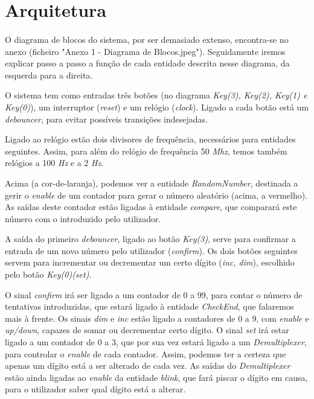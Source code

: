 \documentclass[11pt,openany,twoside]{report}
\begin{document}
\section{Arquitetura}

\paragraph{ } O diagrama de blocos do sistema, por ser demasiado extenso, encontra-se no anexo (ficheiro "Anexo 1 - Diagrama de Blocos.jpeg"). Seguidamente iremos explicar passo a passo a função de cada entidade descrita nesse diagrama, da esquerda para a direita.

O sistema tem como entradas três botões (no diagrama \textit{Key(3), Key(2), Key(1) e Key(0)}), um interruptor (\textit{reset}) e um relógio (\textit{clock}). Ligado a cada botão está um \textit{debouncer}, para evitar possíveis transições indesejadas. 

Ligado ao relógio estão dois divisores de frequência, necessários para entidades seguintes. Assim, para além do relógio de frequência 50 \textit{Mhz}, temos também relógios a 100 \textit{Hz} e a 2 \textit{Hz}.

Acima (a cor-de-laranja), podemos ver a entidade \textit{RandomNumber}, destinada a gerir o \textit{enable} de um contador para gerar o número aleatório (acima, a vermelho). As saídas deste contador estão ligadas à entidade \textit{compare}, que comparará este número com o introduzido pelo utilizador.

A saída do primeiro \textit{debouncer}, ligado ao botão \textit{Key(3)}, serve para confirmar a entrada de um novo número pelo utilizador (\textit{confirm}). Os dois botões seguintes servem para incrementar ou decrementar um certo dígito (\textit{inc, dim}), escolhido pelo botão \textit{Key(0)(set)}.

O sinal \textit{confirm} irá ser ligado a um contador de 0 a 99, para contar o número de tentativas introduzidas, que estará ligado à entidade \textit{CheckEnd}, que falaremos mais à frente. Os sinais \textit{dim} e \textit{inc} estão ligado a contadores de 0 a 9, com \textit{enable} e \textit{up/down}, capazes de somar ou decrementar certo dígito. O sinal \textit{set} irá estar ligado a um contador de 0 a 3, que por sua vez estará ligado a um \textit{Demultiplexer}, para controlar o \textit{enable} de cada contador. Assim, podemos ter a certeza que apenas um dígito está a ser alterado de cada vez. As saídas do \textit{Demultiplexer} estão ainda ligadas ao \textit{enable} da entidade \textit{blink}, que fará piscar o dígito em causa, para o utilizador saber qual dígito está a alterar.
\end{document}
